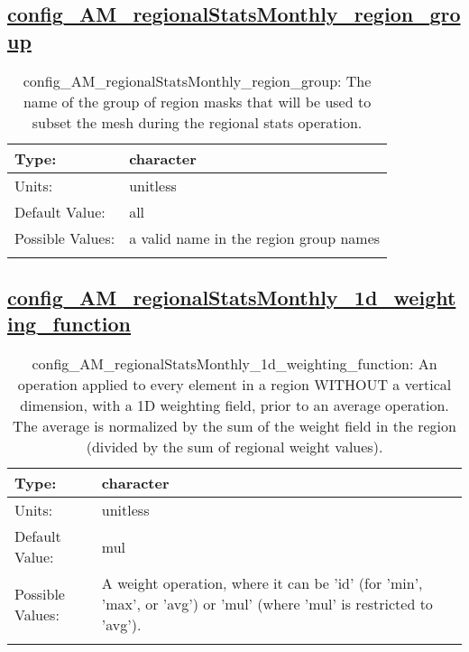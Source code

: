 \subsection[config\_AM\_regionalStatsMonthly\_region\_group]{\hyperref[sec:nm_tab_AM_regionalStatsMonthly]{config\_AM\_regionalStatsMonthly\_region\_group}}
\label{subsec:nm_sec_config_AM_regionalStatsMonthly_region_group}
\begin{center}
\begin{longtable}{| p{2.0in} || p{4.0in} |}
    \hline
    Type: & character \\
    \hline
    Units: & \si{unitless} \\
    \hline
    Default Value: & all \\
    \hline
    Possible Values: & a valid name in the region group names \\
    \hline
    \caption{config\_AM\_regionalStatsMonthly\_region\_group: The name of the group of region masks that will be used to subset the mesh during the regional stats operation.}
\end{longtable}
\end{center}
\subsection[config\_AM\_regionalStatsMonthly\_1d\_weighting\_function]{\hyperref[sec:nm_tab_AM_regionalStatsMonthly]{config\_AM\_regionalStatsMonthly\_1d\_weighting\_function}}
\label{subsec:nm_sec_config_AM_regionalStatsMonthly_1d_weighting_function}
\begin{center}
\begin{longtable}{| p{2.0in} || p{4.0in} |}
    \hline
    Type: & character \\
    \hline
    Units: & \si{unitless} \\
    \hline
    Default Value: & mul \\
    \hline
    Possible Values: & A weight operation, where it can be 'id' (for 'min', 'max', or 'avg') or 'mul' (where 'mul' is restricted to 'avg'). \\
    \hline
    \caption{config\_AM\_regionalStatsMonthly\_1d\_weighting\_function: An operation applied to every element in a region WITHOUT a vertical dimension, with a 1D weighting field, prior to an average operation. The average is normalized by the sum of the weight field in the region (divided by the sum of regional weight values).}
\end{longtable}
\end{center}

